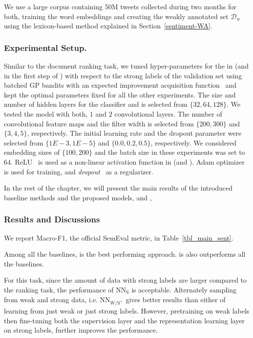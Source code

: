 We use a large corpus containing 50M tweets collected during two months for both, training the word embeddings and creating the weakly annotated set $\mathcal{D}_w$ using the lexicon-based method explained in Section~\ref{sentiment-WA}. 

\subsubsection{Experimental Setup.}
Similar to the document ranking task, we tuned hyper-parameters for the \tnet in \cws (and \std in the first step of \fwl) with respect to the strong labels of the validation set using batched GP bandits with an expected improvement acquisition function~\citep{Desautels:2014} and kept the optimal parameters fixed for all the other experiments.  
The size and number of hidden layers for the classifier and is selected from $\{32, 64, 128\}$.
We tested the model with both, $1$ and $2$ convolutional layers. The number of convolutional feature maps and the filter width is selected from $\{200,300\}$ and $\{ 3, 4, 5\}$, respectively. The initial learning rate and the dropout parameter were selected from $\{1E-3, 1E-5\}$ and $\{0.0, 0.2, 0.5\}$, respectively. We considered embedding sizes of $\{100, 200\}$ and the batch size in these experiments was set to $64$. ReLU~\citep{Nair:2010} is used as a non-linear activation function in \tnet (and \std).  Adam optimizer~\citep{Kingma:2014} is used for training, and \emph{dropout}~\citep{Srivastava:2014} as a regularizer.

In the rest of the chapter, we will present the main results of the introduced baseline methods and the proposed models, \cws and \fwl, 


\subsubsection{Results and Discussions} 

We report Macro-F1, the official SemEval metric, in Table~\ref{tbl_main_sent}. 

Among all the baselines, \fwl is the best performing approach. \cws is also outperforms all the baselines. 

For this task, since the amount of data with strong labels are larger compared to the ranking task, the performance of $\text{NN}_{\text{S}}$ is acceptable. Alternately sampling from weak and strong data, i.e.  $\text{NN}_{\text{W}\text{/S}^+}$ gives better results than either of learning from just weak or just strong labels. However, pretraining on weak labels then fine-tuning both the supervision layer and the representation learning layer on strong labels, further improves the performance.  

